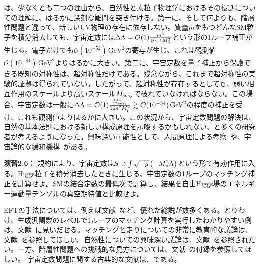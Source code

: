 は、少なくとも二つの理由から、自然性と素粒子物理学におけるその役割についての理解に、はるかに深刻な難問を突き付ける。第一に、そして何よりも、階層性問題と違って、新しいUV物理の存在に依存しない。質量$m$をもつどんなSM粒子を積分消去しても、宇宙定数には$\Delta \Lambda =\mathcal{O}(1) \frac{m^4}{16 \pi^2 M_{\rm p}^2}$という形の1ループ補正が生じる。電子だけでも$\mathcal{O}(10^{-52}) \, \text{GeV}^2$の寄与が生じ、これは観測値$\mathcal{O}(10^{-84}) \, \text{GeV}^2$よりはるかに大きい。第二に、宇宙定数を量子補正から保護できる既知の対称性は、超対称性だけである。残念ながら、これまで超対称性の実験的証拠は得られていない。したがって、超対称性が存在するとしても、弱い相互作用のスケールより高いスケール$M_{\rm susy}$で破れていなければならない。この場合、宇宙定数は一般に$\Delta \Lambda =\mathcal{O}(1) \frac{M_{\rm susy}^4}{16 \pi^2 M_{\rm p}^2} \gtrsim \mathcal{O}(10^{-34}) \, \text{GeV}^2$の程度の補正を受け、これも観測値よりはるかに大きい。この状況から、宇宙定数問題の解決は、自然の基本法則における新しい構成原理を示唆するかもしれない、と多くの研究者が考えるようになった。興味深い可能性として、人間原理による考察~\cite{Weinberg:1987dv}や、宇宙論的な緩和機構~\cite{Alberte:2016izw,Graham:2019bfu}がある。
%
\begin{eBox}
%
{\bf 演習2.6：} 規約により、宇宙定数は$S \supset \int \sqrt{-g} \left( - M_{\rm p}^2 \Lambda \right)$という形で有効作用に入る。Higgs粒子を積分消去したときに生じる、宇宙定数の1ループのマッチング補正を計算せよ。SMの結合定数の最低次で計算し、結果を自由Higgs場のエネルギー運動量テンソルの真空期待値と比較せよ。
%
\end{eBox}
%




EFTの手法については、例えば文献~\cite{Georgi:1994qn,Manohar:1996cq,Pich:1998xt,Rothstein:2003mp,Kaplan:2005es,Burgess:2007pt,Skiba:2010xn,Gripaios:2015qya,Petrov:2016azi,Manohar:2018aog,Cohen:2019wxr}など、優れた総説が数多くある。とりわけ、生成汎関数のレベルで1ループのマッチング計算を実行したわかりやすい例は、文献~\cite{Burgess:2007pt}に見いだせる。マッチングと走りについての非常に教育的な議論は、文献~\cite{Cohen:2019wxr}を参照してほしい。自然性についての興味深い議論は、文献~\cite{Dine:2015xga,Giudice:2017pzm}を参照されたい。一方、階層性問題への挑戦的な見方については、文献~\cite{Manohar:2018aog}の付録を参照してほしい。
宇宙定数問題に関する古典的な文献は、\cite{Weinberg:1988cp}である。


\newpage


